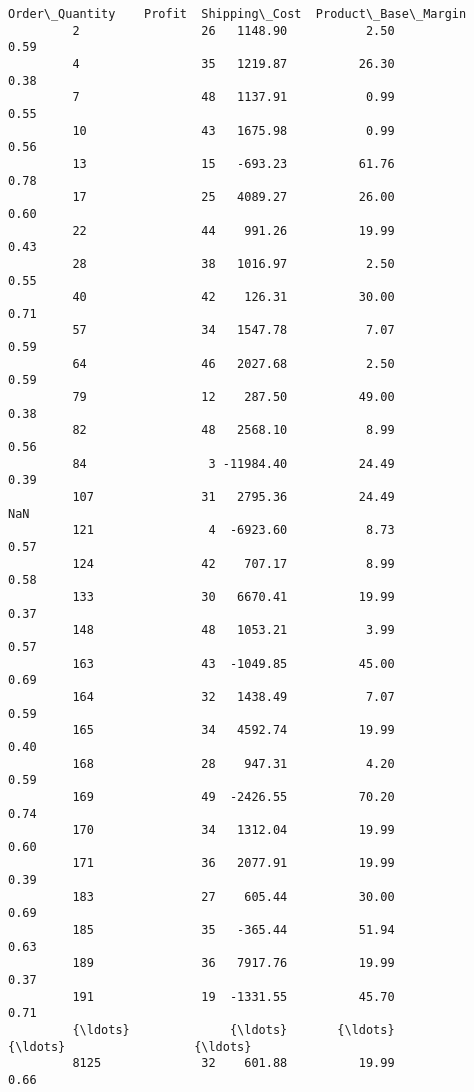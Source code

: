\documentclass[11pt]{article}
\begin{document}
\begin{Verbatim}[commandchars=\\\{\}]
               Order\_Quantity    Profit  Shipping\_Cost  Product\_Base\_Margin  
         2                 26   1148.90           2.50                 0.59  
         4                 35   1219.87          26.30                 0.38  
         7                 48   1137.91           0.99                 0.55  
         10                43   1675.98           0.99                 0.56  
         13                15   -693.23          61.76                 0.78  
         17                25   4089.27          26.00                 0.60  
         22                44    991.26          19.99                 0.43  
         28                38   1016.97           2.50                 0.55  
         40                42    126.31          30.00                 0.71  
         57                34   1547.78           7.07                 0.59  
         64                46   2027.68           2.50                 0.59  
         79                12    287.50          49.00                 0.38  
         82                48   2568.10           8.99                 0.56  
         84                 3 -11984.40          24.49                 0.39  
         107               31   2795.36          24.49                  NaN  
         121                4  -6923.60           8.73                 0.57  
         124               42    707.17           8.99                 0.58  
         133               30   6670.41          19.99                 0.37  
         148               48   1053.21           3.99                 0.57  
         163               43  -1049.85          45.00                 0.69  
         164               32   1438.49           7.07                 0.59  
         165               34   4592.74          19.99                 0.40  
         168               28    947.31           4.20                 0.59  
         169               49  -2426.55          70.20                 0.74  
         170               34   1312.04          19.99                 0.60  
         171               36   2077.91          19.99                 0.39  
         183               27    605.44          30.00                 0.69  
         185               35   -365.44          51.94                 0.63  
         189               36   7917.76          19.99                 0.37  
         191               19  -1331.55          45.70                 0.71  
         {\ldots}              {\ldots}       {\ldots}            {\ldots}                  {\ldots}  
         8125              32    601.88          19.99                 0.66  

\end{Verbatim}
\end{document}
